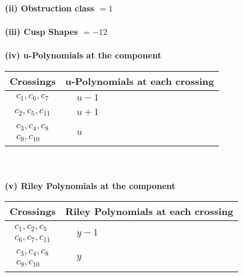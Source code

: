 \documentclass[1p]{elsarticle_modified}
\theoremstyle{definition}
\begin{document}
\flushleft \textbf{(ii) Obstruction class $= 1$}\\~\\
\flushleft \textbf{(iii) Cusp Shapes $= -12$}\\~\\
\newpage\renewcommand{\arraystretch}{1}
\flushleft \textbf{(iv) u-Polynomials at the component}\newline \\
\begin{tabular}{m{50pt}|m{274pt}}
Crossings & \hspace{64pt}u-Polynomials at each crossing \\
\hline $$\begin{aligned}c_{1},c_{6},c_{7}\end{aligned}$$&$\begin{aligned}
&u-1
\end{aligned}$\\
\hline $$\begin{aligned}c_{2},c_{5},c_{11}\end{aligned}$$&$\begin{aligned}
&u+1
\end{aligned}$\\
\hline $$\begin{aligned}c_{3},c_{4},c_{8}\\c_{9},c_{10}\end{aligned}$$&$\begin{aligned}
&u
\end{aligned}$\\
\hline
\end{tabular}\\~\\
\newpage\renewcommand{\arraystretch}{1}
\flushleft \textbf{(v) Riley Polynomials at the component}\newline \\
\begin{tabular}{m{50pt}|m{274pt}}
Crossings & \hspace{64pt}Riley Polynomials at each crossing \\
\hline $$\begin{aligned}c_{1},c_{2},c_{5}\\c_{6},c_{7},c_{11}\end{aligned}$$&$\begin{aligned}
&y-1
\end{aligned}$\\
\hline $$\begin{aligned}c_{3},c_{4},c_{8}\\c_{9},c_{10}\end{aligned}$$&$\begin{aligned}
&y
\end{aligned}$\\
\hline
\end{tabular}\\~\\
\end{document}
